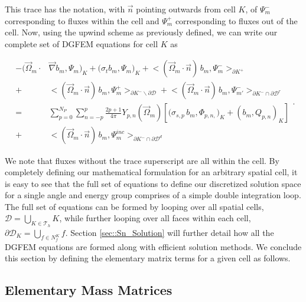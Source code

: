 \noindent This trace has the notation, with $\vec{n}$ pointing outwards from cell $K$, of $\Psi_m^-$ corresponding to fluxes within the cell and $\Psi_m^+$ corresponding to fluxes out of the cell. Now, using the upwind scheme as previously defined, we can write our complete set of DGFEM equations for cell $K$ as

\begin{equation}
\label{eq::Sn_DGFEM_trans_eq_cellK_complete}
\begin{aligned}
-  \Big( \vec{\Omega}_m \cdot  & \vec{\nabla} b_m, \Psi_{m} \Big)_{K}   + \Big(  \sigma_{t} b_m ,   \Psi_{m} \Big)_{K} +  \Big< ( \vec{\Omega}_m \cdot \vec{n} ) \, b_m, {\Psi}_m^{-}  \Big>_{\partial K^+}  \\
  + & \Big< ( \vec{\Omega}_m \cdot \vec{n} ) \, b_m, {\Psi}_m^{+}  \Big>_{\partial K^- \backslash \partial \mathcal{D}}  + \Big< ( \vec{\Omega}_m \cdot \vec{n} ) \, b_m, {\Psi}^{-}_{m'}  \Big>_{\partial K^- \cap \partial \mathcal{D}^r}  \\
= & \sum_{p=0}^{N_P} \sum_{n=-p}^{p} \frac{2p + 1}{4 \pi}  Y_{p,n} (  \vec{\Omega}_m ) \left[ \Big( \sigma_{s,p} \, b_m,  \Phi_{p,n,} \Big)_{K}  + \left(  b_m ,   Q_{p,n} \right)_{K} \right] \\
+ & \Big< ( \vec{\Omega}_m \cdot \vec{n} ) \, b_m, {\Psi}_m^{inc}  \Big>_{\partial K^- \cap \partial \mathcal{D}^d}
\end{aligned} .
\end{equation} 

\noindent We note that fluxes without the trace superscript are all within the cell. By completely defining our mathematical formulation for an arbitrary spatial cell, it is easy to see that the full set of equations to define our discretized solution space for a single angle and energy group comprises of a simple double integration loop. The full set of equations can be formed by looping over all spatial cells, $\mathcal{D} = \bigcup_{K \in \mathcal{T}_h} K$, while further looping over all faces within each cell, $\partial \mathcal{D}_K = \bigcup_{ f \in N_f^K} f$. Section \ref{sec::Sn_Solution} will further detail how all the DGFEM equations are formed along with efficient solution methods. We conclude this section by defining the elementary matrix terms for a given cell as follows.

\subsection{Elementary Mass Matrices}
\label{sec::Sn_Spatial_Mass}

